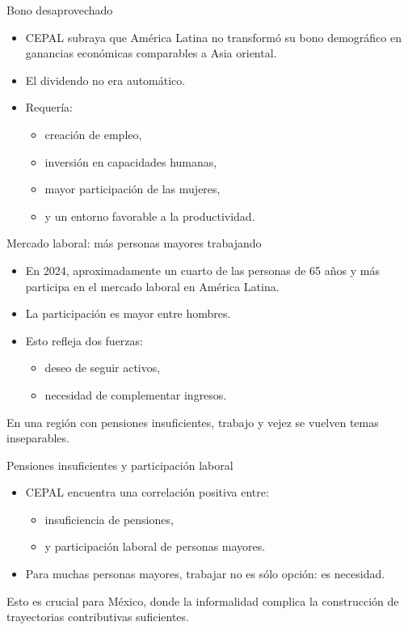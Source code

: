 \documentclass{beamer}
\begin{document}
\begin{frame}{Bono desaprovechado}
\begin{itemize}
    \item CEPAL subraya que América Latina no transformó su bono demográfico en ganancias económicas comparables a Asia oriental.
    \item El dividendo no era automático.
    \item Requería:
    \begin{itemize}
        \item creación de empleo,
        \item inversión en capacidades humanas,
        \item mayor participación de las mujeres,
        \item y un entorno favorable a la productividad.
    \end{itemize}
\end{itemize}
\end{frame}

\begin{frame}{Mercado laboral: más personas mayores trabajando}
\begin{itemize}
    \item En 2024, aproximadamente un cuarto de las personas de 65 años y más participa en el mercado laboral en América Latina.
    \item La participación es mayor entre hombres.
    \item Esto refleja dos fuerzas:
    \begin{itemize}
        \item deseo de seguir activos,
        \item necesidad de complementar ingresos.
    \end{itemize}
\end{itemize}

\vspace{0.3cm}
En una región con pensiones insuficientes, trabajo y vejez se vuelven temas inseparables.
\end{frame}

\begin{frame}{Pensiones insuficientes y participación laboral}
\begin{itemize}
    \item CEPAL encuentra una correlación positiva entre:
    \begin{itemize}
        \item insuficiencia de pensiones,
        \item y participación laboral de personas mayores.
    \end{itemize}
    \item Para muchas personas mayores, trabajar no es sólo opción: es necesidad.
\end{itemize}

\vspace{0.3cm}
Esto es crucial para México, donde la informalidad complica la construcción de trayectorias contributivas suficientes.
\end{frame}
\end{document}
